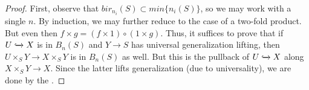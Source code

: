 \begin{proof}
    First, observe that $bir_{n_i}(S)\subset {min \{n_i(S)\}}$, so we may work with a single ${n}$. By induction, we may further reduce to the case of a two-fold product. But even then $f\times g=(f\times1)\circ (1\times g)$. Thus, it suffices to prove that if $U\xhookrightarrow{} X$ is in $B_n(S)$ and $Y\to S$ has universal generalization lifting, then $U\times_S Y\to X\times_S Y$ is in $B_n(S)$ as well. But this is the pullback of $U\xhookrightarrow{} X$ along $X\times_S Y\to X$. Since the latter lifts generalization (due to universality), we are done by the .
\end{proof}


